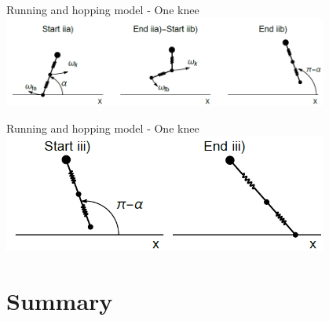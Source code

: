 \documentclass{beamer}
\begin{document}
\begin{frame}{Running and hopping model - One knee}
  \centering
    \includegraphics[width=0.8\textwidth]{secondphase.png}
\end{frame}

\begin{frame}{Running and hopping model - One knee}
  \centering
    \includegraphics[width=0.8\textwidth]{thirdphase.png}
\end{frame}

\section{Summary}
\end{document}
